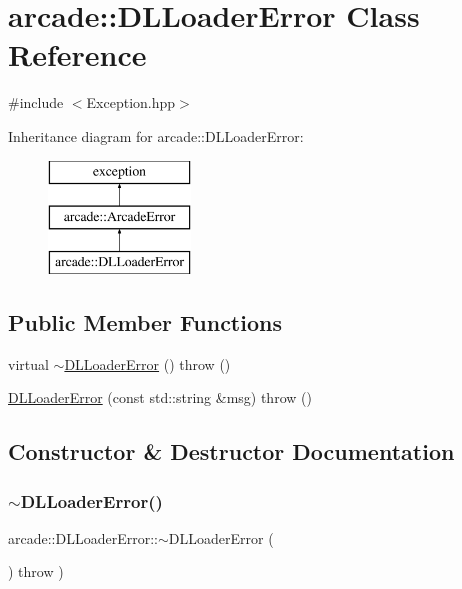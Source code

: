 \hypertarget{classarcade_1_1_d_l_loader_error}{}\section{arcade\+:\+:D\+L\+Loader\+Error Class Reference}
\label{classarcade_1_1_d_l_loader_error}


{\ttfamily \#include $<$Exception.\+hpp$>$}

Inheritance diagram for arcade\+:\+:D\+L\+Loader\+Error\+:\begin{figure}[H]
\begin{center}
\leavevmode
\includegraphics[height=3.000000cm]{classarcade_1_1_d_l_loader_error}
\end{center}
\end{figure}
\subsection*{Public Member Functions}
\begin{DoxyCompactItemize}
\item 
virtual \hyperlink{classarcade_1_1_d_l_loader_error_aa5f76a44c1fcddd0767cde52e19193b6}{$\sim$\+D\+L\+Loader\+Error} ()  throw ()
\item 
\hyperlink{classarcade_1_1_d_l_loader_error_a24f7cd1e5f5e897e535e0219802edb0d}{D\+L\+Loader\+Error} (const std\+::string \&msg)  throw ()
\end{DoxyCompactItemize}


\subsection{Constructor \& Destructor Documentation}
\mbox{\label{classarcade_1_1_d_l_loader_error_aa5f76a44c1fcddd0767cde52e19193b6}} 
\subsubsection{\texorpdfstring{$\sim$\+D\+L\+Loader\+Error()}{~DLLoaderError()}}
{\footnotesize\ttfamily arcade\+::\+D\+L\+Loader\+Error\+::$\sim$\+D\+L\+Loader\+Error (\begin{DoxyParamCaption}{ }\end{DoxyParamCaption}) throw  ) \hspace{0.3cm}{\ttfamily [virtual]}}

